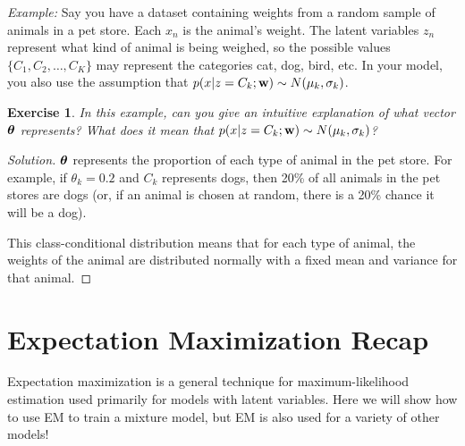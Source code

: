\documentclass[12pt,letterpaper]{article}
\newtheorem{exercise}{Exercise}
\newenvironment{exercisesolution}
  {\begin{proof}[Solution]}
  {\end{proof}}
\begin{document}
\emph{Example:}  Say you have a dataset containing weights from a random sample of animals in a pet store.  Each $x_n$ is the animal's weight.  The latent variables $z_n$ represent what kind of animal is being weighed, so the possible values $\{C_1, C_2, \ldots, C_K\}$ may represent the categories cat, dog, bird, etc.  In your model, you also use the assumption that $p(x | z = C_k ; \mathbf{w}) \sim N(\mu_k, \sigma_k)$.

\vspace{2em}
\begin{exercise}
In this example, can you give an intuitive explanation of what vector $\boldsymbol{\theta}$ represents?  What does it mean that $p(x | z = C_k ; \mathbf{w}) \sim N(\mu_k, \sigma_k)$?
\end{exercise}

\begin{solution}
    \begin{exercisesolution}
    $\boldsymbol{\theta}$ represents the proportion of each type of animal in the pet store.  For example, if $\theta_k = 0.2$ and $C_k$ represents dogs, then 20\% of all animals in the pet stores are dogs (or, if an animal is chosen at random, there is a 20\% chance it will be a dog).

    This class-conditional distribution means that for each type of animal, the weights of the animal are distributed normally with a fixed mean and variance for that animal.  
    \end{exercisesolution}
\end{solution}


    

\section{Expectation Maximization Recap}

Expectation maximization is a general technique for maximum-likelihood estimation used primarily for models with latent variables. Here we will show how to use EM to train a mixture model, but EM is also used for a variety of other models!
\end{document}
